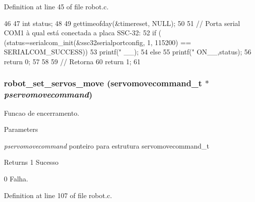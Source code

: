 Definition at line 45 of file robot.c.


\begin{DoxyCode}
46 {
47         int status;
48         
49         gettimeofday(&timereset, NULL);
50  
51         // Porta serial COM1 à qual está conectada a placa SSC-32:
52         if ( (status=serialcom_init(&ssc32serialportconfig, 1, 115200) ==  
      SERIALCOM_SUCCESS)){
53                 printf("\n %
      __);
54         } else {
55                 printf("\n %
      ON__,status);
56                 return 0;
57         }
58 
59         // Retorna 
60         return 1; 
61 }                      
\end{DoxyCode}
\subsubsection[{robot\_\-set\_\-servos\_\-move}]{\setlength{\rightskip}{0pt plus 5cm}robot\_\-set\_\-servos\_\-move (servomovecommand\_\-t $\ast$ {\em pservomovecommand})}\label{robot_8c_ab1ac396388c604ce6d516e3d2d013042}


Funcao de encerramento. 
\begin{DoxyParams}{Parameters}
\item[{\em pservomovecommand}]ponteiro para estrutura servomovecommand\_\-t \end{DoxyParams}
\begin{DoxyReturn}{Returns}
1 Sucesso 

0 Falha. 
\end{DoxyReturn}


Definition at line 107 of file robot.c.


